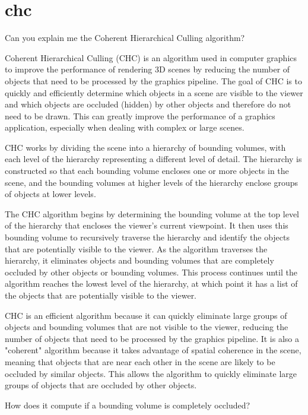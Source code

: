 \section*{\ac{chc}}
\begin{description}
	\me Can you explain me the Coherent Hierarchical Culling algorithm?

	\gpt Coherent Hierarchical Culling (CHC) is an algorithm used in computer graphics to improve the performance of rendering 3D scenes by reducing the number of objects that need to be processed by the graphics pipeline. The goal of CHC is to quickly and efficiently determine which objects in a scene are visible to the viewer and which objects are occluded (hidden) by other objects and therefore do not need to be drawn. This can greatly improve the performance of a graphics application, especially when dealing with complex or large scenes.

	CHC works by dividing the scene into a hierarchy of bounding volumes, with each level of the hierarchy representing a different level of detail. The hierarchy is constructed so that each bounding volume encloses one or more objects in the scene, and the bounding volumes at higher levels of the hierarchy enclose groups of objects at lower levels.

	The CHC algorithm begins by determining the bounding volume at the top level of the hierarchy that encloses the viewer's current viewpoint. It then uses this bounding volume to recursively traverse the hierarchy and identify the objects that are potentially visible to the viewer. As the algorithm traverses the hierarchy, it eliminates objects and bounding volumes that are completely occluded by other objects or bounding volumes. This process continues until the algorithm reaches the lowest level of the hierarchy, at which point it has a list of the objects that are potentially visible to the viewer.

	CHC is an efficient algorithm because it can quickly eliminate large groups of objects and bounding volumes that are not visible to the viewer, reducing the number of objects that need to be processed by the graphics pipeline. It is also a "coherent" algorithm because it takes advantage of spatial coherence in the scene, meaning that objects that are near each other in the scene are likely to be occluded by similar objects. This allows the algorithm to quickly eliminate large groups of objects that are occluded by other objects.

	\me How does it compute if a bounding volume is completely occluded?


\end{description}
